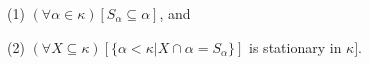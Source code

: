 (1) $(\forall \alpha \in \kappa)[S_{\alpha} \subseteq \alpha]$, and

(2) $(\forall X \subseteq \kappa)[\{\alpha < \kappa | X \cap \alpha = S_{\alpha}\}]$ is stationary in $\kappa]$.
